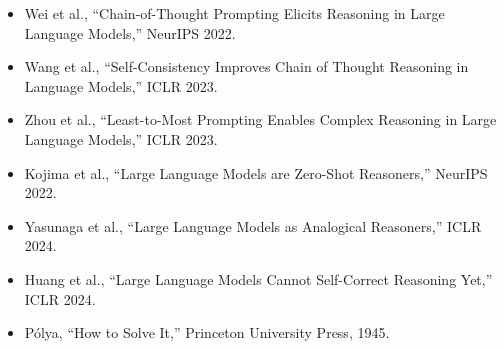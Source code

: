 \begin{itemize}
    \item Wei et al., ``Chain-of-Thought Prompting Elicits Reasoning in Large Language Models,'' NeurIPS 2022.
    \item Wang et al., ``Self-Consistency Improves Chain of Thought Reasoning in Language Models,'' ICLR 2023.
    \item Zhou et al., ``Least-to-Most Prompting Enables Complex Reasoning in Large Language Models,'' ICLR 2023.
    \item Kojima et al., ``Large Language Models are Zero-Shot Reasoners,'' NeurIPS 2022.
    \item Yasunaga et al., ``Large Language Models as Analogical Reasoners,'' ICLR 2024.
    \item Huang et al., ``Large Language Models Cannot Self-Correct Reasoning Yet,'' ICLR 2024.
    \item P\'{o}lya, ``How to Solve It,'' Princeton University Press, 1945.
\end{itemize}



